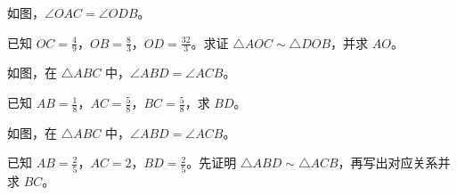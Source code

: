 \documentclass{exam-zh}
\begin{document}

\begin{problem}[points=10]
  \noindent
  \begin{minipage}[t]{\dimexpr\linewidth-60mm-6mm\relax}
    \vspace{0pt}
    如图，$\angle OAC=\angle ODB$。

已知 $OC=\frac{4}{9}$，$OB=\frac{8}{3}$，$OD=\frac{32}{3}$。求证 $\triangle AOC\sim\triangle DOB$，并求 $AO$。
    
  \end{minipage}\hfill
  \begin{diagramcoltikz}{60mm}{先用对顶角补齐第二组等角，再按顶点顺序配边。}
  }
  \end{diagramcoltikz}
  \par\medskip
  \answerarea[48mm]
\end{problem}



\begin{problem}[points=10]
  \noindent
  \begin{minipage}[t]{\dimexpr\linewidth-60mm-6mm\relax}
    \vspace{0pt}
    如图，在 $\triangle ABC$ 中，$\angle ABD=\angle ACB$。

已知 $AB=\frac{1}{8}$，$AC=\frac{5}{8}$，$BC=\frac{5}{8}$，求 $BD$。
    
  \end{minipage}\hfill
  \begin{diagramcoltikz}{60mm}{先确认对应边，再判断题中的线段是否属于相似三角形。}
  }
  \end{diagramcoltikz}
  \par\medskip
  \answerarea[48mm]
\end{problem}



\begin{problem}[points=10]
  \noindent
  \begin{minipage}[t]{\dimexpr\linewidth-60mm-6mm\relax}
    \vspace{0pt}
    如图，在 $\triangle ABC$ 中，$\angle ABD=\angle ACB$。

已知 $AB=\frac{2}{5}$，$AC=2$，$BD=\frac{2}{5}$。先证明 $\triangle ABD\sim\triangle ACB$，再写出对应关系并求 $BC$。
    
  \end{minipage}\hfill
  \begin{diagramcoltikz}{60mm}{先确认对应边，再判断题中的线段是否属于相似三角形。}
  }
  \end{diagramcoltikz}
  \par\medskip
  \answerarea[48mm]
\end{problem}
\end{document}
